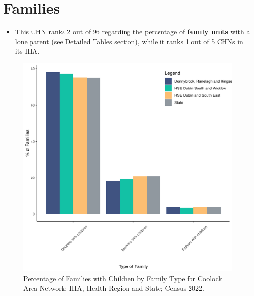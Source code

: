 \documentclass{article}
\begin{document}
\section{Families}\label{sect:Fam}
\begin{itemize}
\item This CHN ranks  2 out of 96 regarding the percentage of \textbf{family units} with a lone parent (see Detailed Tables section), while it ranks   1 out of 5 CHNs in its IHA.
\end{itemize}
\begin{figure}[H]
	\centering
	\includegraphics[width = 150mm]{../figures/FamED.pdf}
	\caption{Percentage of Families with Children by Family Type for Coolock Area Network; IHA, Health Region and State; Census 2022.}
	\label{fig:vbnv}
	\end{figure}
	
\end{document}
